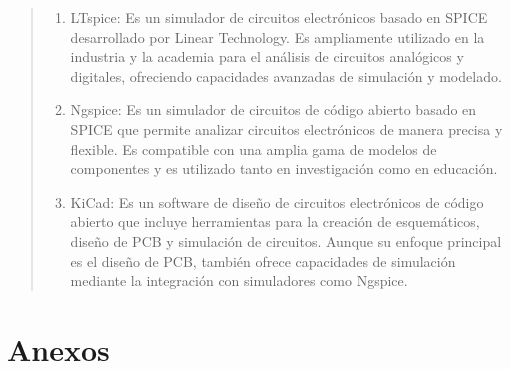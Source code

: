 \documentclass{article}
\begin{document}
\begin{enumerate}[label=\alph*.-]
\begin{quote}
            \begin{enumerate}
                \item LTspice: Es un simulador de circuitos electrónicos basado en SPICE desarrollado por Linear Technology. Es ampliamente utilizado en la industria y la academia para el análisis de circuitos analógicos y digitales, ofreciendo capacidades avanzadas de simulación y modelado.
                \item Ngspice: Es un simulador de circuitos de código abierto basado en SPICE que permite analizar circuitos electrónicos de manera precisa y flexible. Es compatible con una amplia gama de modelos de componentes y es utilizado tanto en investigación como en educación.
                \item KiCad: Es un software de diseño de circuitos electrónicos de código abierto que incluye herramientas para la creación de esquemáticos, diseño de PCB y simulación de circuitos. Aunque su enfoque principal es el diseño de PCB, también ofrece capacidades de simulación mediante la integración con simuladores como Ngspice.
            \end{enumerate}
        \end{quote}
    \end{enumerate}
    
    \nocite{*}
    \printbibliography{}

    \section{Anexos}


\end{document}
